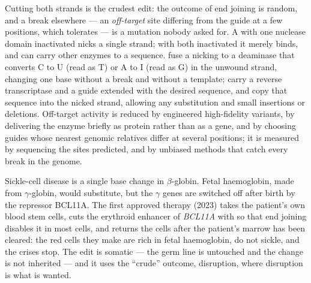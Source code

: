 \begin{proposition}\label{prop:b3:genetic-engineering:editors}
Cutting both strands is the crudest edit: the outcome of end joining is
random, and a break elsewhere --- an \emph{off-target} site differing
from the guide at a few positions, which  tolerates --- is a
mutation nobody asked for. A  with one nuclease domain inactivated
nicks a single strand; with both inactivated it merely binds, and can
carry other enzymes to a sequence. \emph{} fuse a
nicking  to a deaminase that converts C to U (read as T) or A to I
(read as G) in the unwound strand, changing one base without a break
and without a template; \emph{} carry a reverse
transcriptase and a guide extended with the desired sequence, and copy
that sequence into the nicked strand, allowing any substitution and
small insertions or deletions. Off-target activity is reduced by
engineered high-fidelity  variants, by delivering the enzyme
briefly as protein rather than as a gene, and by choosing guides whose
nearest genomic relatives differ at several positions; it is measured
by sequencing the sites predicted, and by unbiased methods that catch
every break in the genome.
\end{proposition}

\begin{example}[A cure]\label{ex:b3:genetic-engineering:sickle}
Sickle-cell disease is a single base change in $\beta$-globin. Fetal
haemoglobin, made from $\gamma$-globin, would substitute, but the
$\gamma$ genes are switched off after birth by the repressor BCL11A.
The first approved  therapy (2023) takes the patient's own blood
stem cells, cuts the erythroid enhancer of \emph{BCL11A} with  so
that end joining disables it in most cells, and returns the cells after
the patient's marrow has been cleared: the red cells they make are rich
in fetal haemoglobin, do not sickle, and the crises stop. The edit is
somatic --- the germ line is untouched and the change is not inherited
--- and it uses the ``crude'' outcome, disruption, where disruption is
what is wanted.
\end{example}

